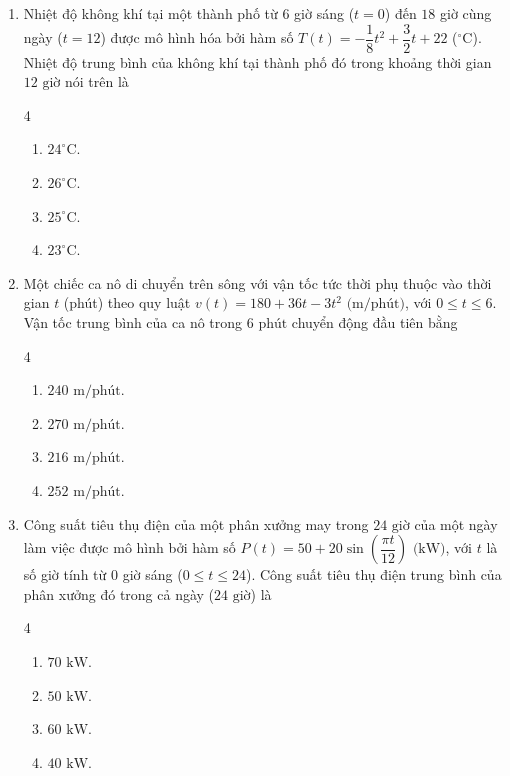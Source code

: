 \documentclass[12pt]{article}
\begin{document}
\begin{enumerate}[label=\textbf{Câu \arabic*.}]
		\item Nhiệt độ không khí tại một thành phố từ $6$ giờ sáng ($t = 0$) đến $18$ giờ cùng ngày ($t = 12$) được mô hình hóa bởi hàm số $T(t) = -\dfrac{1}{8}t^2 + \dfrac{3}{2}t + 22$ ($^\circ\text{C}$). Nhiệt độ trung bình của không khí tại thành phố đó trong khoảng thời gian $12\text{ giờ}$ nói trên là
		\begin{multicols}{4}
			\begin{enumerate}[label=\textbf{\Alph*.}]
				\item $24^\circ\text{C}$.
				\item $26^\circ\text{C}$.
				\item $25^\circ\text{C}$.
				\item $23^\circ\text{C}$.
			\end{enumerate}
		\end{multicols}
		
		\item Một chiếc ca nô di chuyển trên sông với vận tốc tức thời phụ thuộc vào thời gian $t$ (phút) theo quy luật $v(t) = 180 + 36t - 3t^2\text{ (m/phút)}$, với $0 \le t \le 6$. Vận tốc trung bình của ca nô trong $6\text{ phút}$ chuyển động đầu tiên bằng
		\begin{multicols}{4}
			\begin{enumerate}[label=\textbf{\Alph*.}]
				\item $240\text{ m/phút}$.
				\item $270\text{ m/phút}$.
				\item $216\text{ m/phút}$.
				\item $252\text{ m/phút}$.
			\end{enumerate}
		\end{multicols}
		
		\item Công suất tiêu thụ điện của một phân xưởng may trong $24\text{ giờ}$ của một ngày làm việc được mô hình bởi hàm số $P(t) = 50 + 20\sin\left(\dfrac{\pi t}{12}\right)\text{ (kW)}$, với $t$ là số giờ tính từ $0$ giờ sáng ($0 \le t \le 24$). Công suất tiêu thụ điện trung bình của phân xưởng đó trong cả ngày ($24\text{ giờ}$) là
		\begin{multicols}{4}
			\begin{enumerate}[label=\textbf{\Alph*.}]
				\item $70\text{ kW}$.
				\item $50\text{ kW}$.
				\item $60\text{ kW}$.
				\item $40\text{ kW}$.
			\end{enumerate}
		\end{multicols}
		

\end{enumerate}
\end{document}
